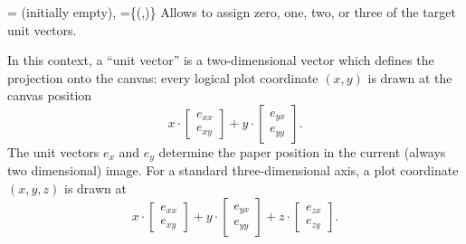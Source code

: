 \begin{pgfplotsxykeylist}{%
    \x= (initially empty),
    \x={\{(,)\}}%
}
    Allows to assign zero, one, two, or three of the target unit vectors.

    In this context, a ``unit vector'' is a two-dimensional vector which
    defines the projection onto the canvas: every logical plot coordinate
    $(x,y)$ is drawn at the canvas position
        \begin{equation*}
            x \cdot
                \begin{bmatrix}
                    e_{xx} \\
                    e_{xy}
                \end{bmatrix}
                    + y \cdot
                        \begin{bmatrix}
                            e_{yx} \\
                            e_{yy}
                        \end{bmatrix}.
        \end{equation*}
    The unit vectors $e_x$ and $e_y$ determine the paper position in the
    current (always two dimensional) image. For a standard three-dimensional
    axis, a plot coordinate $(x,y,z)$ is drawn at
        \begin{equation*}
            x \cdot
                \begin{bmatrix}
                    e_{xx} \\
                    e_{xy}
                \end{bmatrix}
                    + y \cdot
                        \begin{bmatrix}
                            e_{yx} \\
                            e_{yy}
                        \end{bmatrix}
                            + z \cdot
                                \begin{bmatrix}
                                    e_{zx} \\
                                    e_{zy}
                                \end{bmatrix}.
        \end{equation*}


\end{pgfplotsxykeylist}
